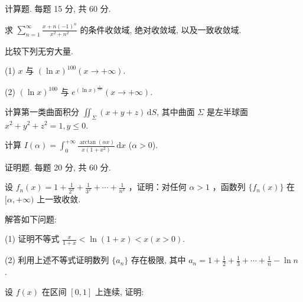 \par{}
计算题. 每题 15 分, 共 60 分.\par
求 $\sum_{n=1}^{\infty} \frac{x + n(-1)^n}{x^2 + n^2}$ 的条件收敛域, 绝对收敛域, 以及一致收敛域.\par
比较下列无穷大量.\par
(1) $x$ 与 $(\ln x)^{100}(x \to +\infty)$.\par
(2) $(\ln x)^{100}$ 与 $e^{(\ln x)^{\frac{1}{100}}} (x \to +\infty)$.\par
计算第一类曲面积分 $\iint_{\Sigma} (x + y + z) \, \mathrm{d}S$, 其中曲面 $\Sigma$ 是左半球面 $x^2 + y^2 + z^2 = 1, y \leq 0$.\par
计算 $I(\alpha) = \int_{0}^{+\infty} \frac{\arctan(\alpha x)}{x(1 + x^2)} \, \mathrm{d}x$ ($\alpha > 0$).\par
\par{}
证明题. 每题 20 分, 共 60 分.\par
设  $f_{n}(x)=1+\frac{1}{2^{x}}+\frac{1}{3^{x}}+\cdots+\frac{1}{n^{x}}$ ，证明：对任何  $\alpha>1$ ，函数列  $\{f_{n}(x)\}$  在  $[\alpha,+\infty)$  上一致收敛.\par
解答如下问题:\par
(1) 证明不等式 $\frac{x}{1 + x} < \ln (1 + x) < x (x > 0)$.\par
(2) 利用上述不等式证明数列  $\{a_{n}\}$  存在极限, 其中  $a_{n}=1+\frac{1}{2}+\frac{1}{3}+\cdots+\frac{1}{n}-\ln n$ .\par
\par{}
设 $f(x)$ 在区间 $[0,1]$ 上连续, 证明:\par
